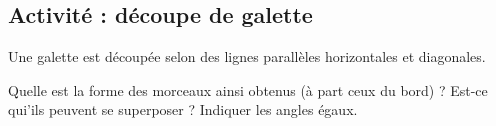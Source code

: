 
\subsection*{Activité : découpe de galette}

    Une galette est découpée selon des lignes parallèles horizontales et diagonales.

\begin{center}
   
\end{center}

Quelle est la forme des morceaux ainsi obtenus (à part ceux du bord) ? Est-ce qui'ils peuvent se superposer ? Indiquer les angles égaux.



